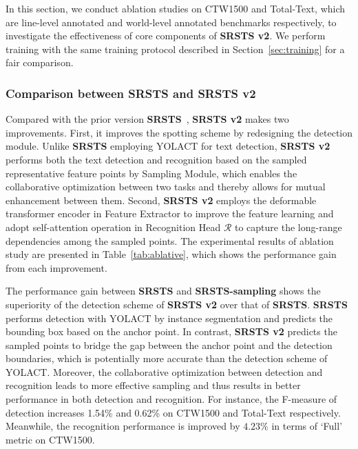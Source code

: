 In this section, we conduct ablation studies on CTW1500 and Total-Text, which are line-level annotated and world-level annotated benchmarks respectively, to investigate the effectiveness of core components of \textbf{SRSTS v2}. We perform training with the same training protocol described in Section~\ref{sec:training} for a fair comparison.




\subsubsection{Comparison between \textbf{SRSTS} and \textbf{SRSTS v2}}
\label{sec: comparison}

Compared with the prior version \textbf{SRSTS}~\cite{wu2022decoupling}, \textbf{SRSTS v2} makes two improvements. First, it improves the spotting scheme by redesigning the detection module. Unlike \textbf{SRSTS} employing YOLACT for text detection, \textbf{SRSTS v2} performs both the text detection and recognition based on the sampled representative feature points by Sampling Module, which enables the collaborative optimization between two tasks and thereby allows for mutual enhancement between them. Second, \textbf{SRSTS v2} employs the deformable transformer encoder in Feature Extractor to improve the feature learning and adopt self-attention operation in Recognition Head $\mathcal{R}$ to capture the long-range dependencies among the sampled points. The experimental results of ablation study are presented in Table~\ref{tab:ablative}, which shows the performance gain from each improvement.

The performance gain between \textbf{SRSTS} and \textbf{SRSTS-sampling} shows the superiority of the detection scheme of \textbf{SRSTS v2} over that of \textbf{SRSTS}. \textbf{SRSTS} performs detection with YOLACT by instance segmentation and predicts the bounding box based on the anchor point. In contrast, \textbf{SRSTS v2} predicts the sampled points to bridge the gap between the anchor point and the detection boundaries, which is potentially more accurate than the detection scheme of YOLACT. Moreover, the collaborative optimization between detection and recognition leads to more effective sampling and thus results in better performance in both detection and recognition. For instance, the F-measure of detection increases 1.54\% and 0.62\% on CTW1500 and Total-Text respectively. Meanwhile, the recognition performance is improved by $4.23\%$ in terms of `Full' metric on CTW1500.





